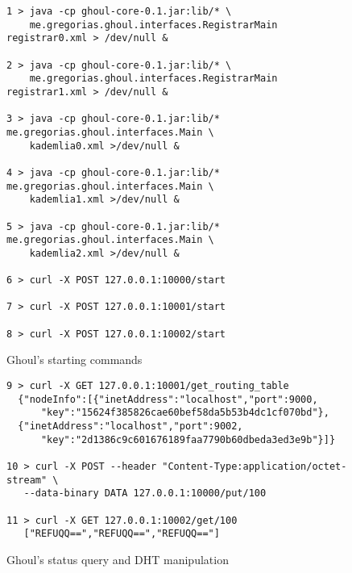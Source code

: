 \begin{figure}[tbp]
\begin{verbatim}
1 > java -cp ghoul-core-0.1.jar:lib/* \
    me.gregorias.ghoul.interfaces.RegistrarMain registrar0.xml > /dev/null &

2 > java -cp ghoul-core-0.1.jar:lib/* \
    me.gregorias.ghoul.interfaces.RegistrarMain registrar1.xml > /dev/null &

3 > java -cp ghoul-core-0.1.jar:lib/* me.gregorias.ghoul.interfaces.Main \ 
    kademlia0.xml >/dev/null &

4 > java -cp ghoul-core-0.1.jar:lib/* me.gregorias.ghoul.interfaces.Main \ 
    kademlia1.xml >/dev/null &

5 > java -cp ghoul-core-0.1.jar:lib/* me.gregorias.ghoul.interfaces.Main \ 
    kademlia2.xml >/dev/null &

6 > curl -X POST 127.0.0.1:10000/start

7 > curl -X POST 127.0.0.1:10001/start

8 > curl -X POST 127.0.0.1:10002/start
\end{verbatim}
\caption{Ghoul's starting commands}
\label{fig:ghoul_manual_run}
\end{figure}

\begin{figure}[tbp]
\begin{verbatim}
9 > curl -X GET 127.0.0.1:10001/get_routing_table
  {"nodeInfo":[{"inetAddress":"localhost","port":9000,
      "key":"15624f385826cae60bef58da5b53b4dc1cf070bd"},
  {"inetAddress":"localhost","port":9002,
      "key":"2d1386c9c601676189faa7790b60dbeda3ed3e9b"}]}

10 > curl -X POST --header "Content-Type:application/octet-stream" \ 
   --data-binary DATA 127.0.0.1:10000/put/100

11 > curl -X GET 127.0.0.1:10002/get/100
   ["REFUQQ==","REFUQQ==","REFUQQ=="]
\end{verbatim}
\caption{Ghoul's status query and DHT manipulation}
\label{fig:ghoul_manipulation}
\end{figure}
